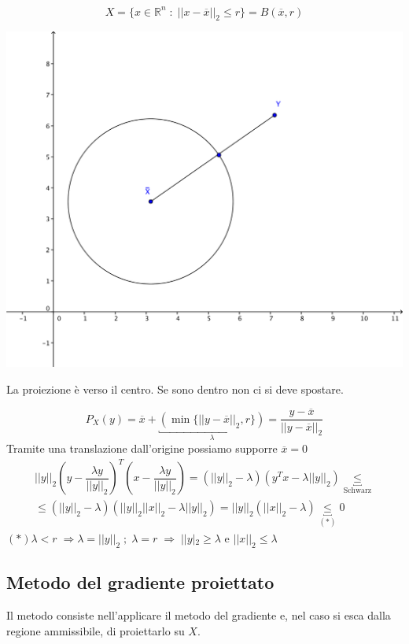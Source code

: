\begin{example}[Sfera]
$$
X  = \{ x \in \mathbb{R}^{n} \; : \;
|| x - \overline{x}||_{2} \leq r \} = B(\overline{x},r)
$$

\begin{center}
  \includegraphics[scale=0.6]{imgs/sferavincolo.png}
\end{center}

La proiezione \`e verso il centro.
Se sono dentro non ci si deve spostare.

$$P_{X}(y) = \overline{x} + \underbracket{(\min \{ || y - \overline{x}||_{2},r\})}_{\lambda} =
\dfrac{y-\overline{x}}{||y - \overline{x} ||_{2}}
$$
Tramite una translazione dall'origine possiamo supporre $\overline{x}=0$
$$
\begin{array}{l}
|| y||_{2} (y - \dfrac{\lambda y}{ ||y||_{2}})^{T}
(x - \dfrac{\lambda y}{ ||y||_{2}}) = 
(||y||_{2} - \lambda) (y^{T}x - \lambda ||y||_{2})
\underbracket{\leq}_{\text{Schwarz}} \\
\leq (||y||_{2}-\lambda)(||y||_{2} ||x||_{2} - \lambda||y||_{2})
= ||y||_{2} (||x||_{2} - \lambda) \underbracket{\leq}_{(*)} 0 
\end{array}
$$
$ (*) \lambda <r \; \Rightarrow \lambda = ||y||_{2} \; ; \;
\lambda = r \; \Rightarrow \; ||y|_{2} \geq \lambda \text{ e }
||x||_{2} \leq \lambda 
 $
\end{example}

\subsection{Metodo del gradiente proiettato}
Il metodo consiste nell'applicare il metodo del gradiente e, nel caso
si esca dalla regione ammissibile, di proiettarlo su $X$.

